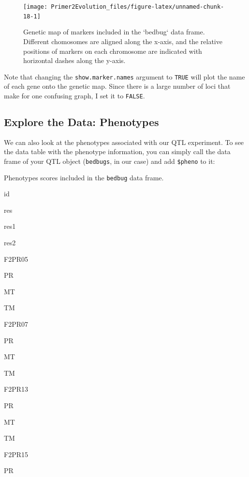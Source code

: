 \documentclass[
]{book}
\newenvironment{Shaded}{\begin{snugshade}}{\end{snugshade}}
\newcommand{\NormalTok}[1]{#1}
\newcommand{\VariableTok}[1]{\textcolor[rgb]{0.00,0.00,0.00}{#1}}
\begin{document}
\begin{figure}
\texttt{[image: Primer2Evolution\_files/figure-latex/unnamed-chunk-18-1]} \caption{Genetic map of markers included in the `bedbug` data frame. Different chomosomes are aligned along the x-axis, and the relative positions of markers on each chromosome are indicated with horizontal dashes along the y-axis.}\label{fig:unnamed-chunk-18}
\end{figure}

Note that changing the \texttt{show.marker.names} argument to \texttt{TRUE} will plot the name of each gene onto the genetic map. Since there is a large number of loci that make for one confusing graph, I set it to \texttt{FALSE}.

\hypertarget{explore-the-data-phenotypes}{%
\subsection{Explore the Data: Phenotypes}\label{explore-the-data-phenotypes}}

We can also look at the phenotypes associated with our QTL experiment. To see the data table with the phenotype information, you can simply call the data frame of your QTL object (\texttt{bedbugs}, in our case) and add \texttt{\$pheno} to it:

\begin{Shaded}
\end{Shaded}

\label{tab:unnamed-chunk-19}Phenotypes scores included in the \texttt{bedbug} data frame.

id

res

res1

res2

F2PR05

PR

MT

TM

F2PR07

PR

MT

TM

F2PR13

PR

MT

TM

F2PR15

PR
\end{document}
